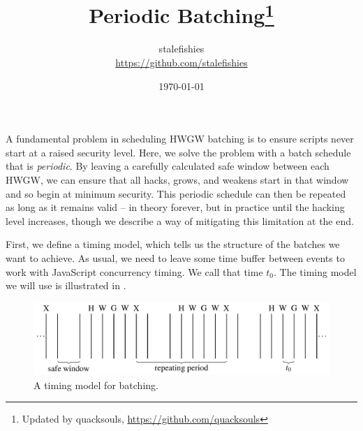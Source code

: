 \documentclass[a4paper,oneside,12pt]{article}
\title{\Large\bf Periodic Batching\footnote{%
    Updated by quacksouls, \url{https://github.com/quacksouls}
  }}
\author{%
  stalefishies \\
  \url{https://github.com/stalefishies}
}
\date{\today}
\begin{document}
\maketitle

\noindent
A fundamental problem in scheduling HWGW batching is to ensure scripts
never start at a raised security level.  Here, we solve the problem
with a batch schedule that is \emph{periodic}.  By leaving a carefully
calculated safe window between each HWGW, we can ensure that all
hacks, grows, and weakens start in that window and so begin at minimum
security.  This periodic schedule can then be repeated as long as it
remains valid -- in theory forever, but in practice until the hacking
level increases, though we describe a way of mitigating this
limitation at the end.

First, we define a timing model, which tells us the structure of the
batches we want to achieve.  As usual, we need to leave some time
buffer between events to work with JavaScript concurrency timing.  We
call that time $t_0$.  The timing model we will use is illustrated in
.

\begin{figure}[!htbp]
\centering
\captionsetup{font=normal,justification=justified}
\includegraphics[scale=0.525]{image/model.pdf}
\caption{%
  A timing model for batching.
}
\label{fig:batching_model}
\end{figure}


\end{document}
